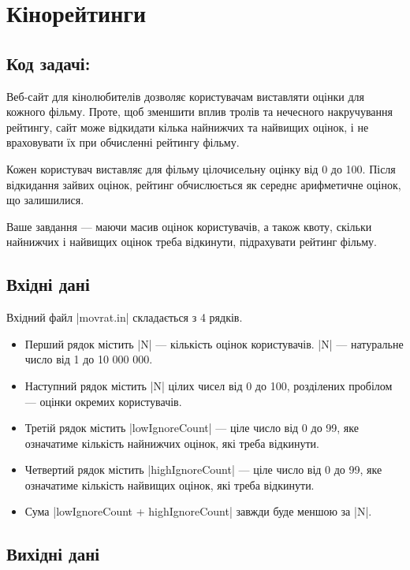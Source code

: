 \documentclass[12pt,a4paper]{article}
\begin{document}
\section*{Кінорейтинги \hfill {}}


\subsection*{Код задачі: }

Веб-сайт для кінолюбителів дозволяє користувачам виставляти оцінки для кожного фільму. Проте, щоб зменшити вплив тролів та нечесного накручування рейтингу, сайт може відкидати кілька найнижчих та найвищих оцінок, і не враховувати їх при обчисленні рейтингу фільму.

Кожен користувач виставляє для фільму цілочисельну оцінку від 0 до 100. Після відкидання зайвих оцінок, рейтинг обчислюється як середнє арифметичне оцінок, що залишилися.

Ваше завдання --- маючи масив оцінок користувачів, а також квоту, скільки найнижчих і найвищих оцінок треба відкинути, підрахувати рейтинг фільму.


\subsection*{Вхідні дані}

Вхідний файл |movrat.in| складається з 4 рядків.

\begin{itemize}
    \item Перший рядок містить |N| --- кількість оцінок користувачів. |N| --- натуральне число від 1 до 10 000 000.
    \item Наступний рядок містить |N| цілих чисел від 0 до 100, розділених пробілом --- оцінки окремих користувачів.
    \item Третій рядок містить |lowIgnoreCount| --- ціле число від 0 до 99, яке означатиме кількість найнижчих оцінок, які треба відкинути.
    \item Четвертий рядок містить |highIgnoreCount| --- ціле число від 0 до 99, яке означатиме кількість найвищих оцінок, які треба відкинути.
    \item Сума |lowIgnoreCount + highIgnoreCount| завжди буде меншою за |N|.
\end{itemize}


\subsection*{Вихідні дані}
\end{document}
